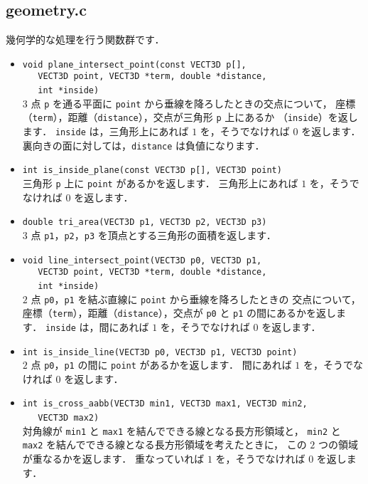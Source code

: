 \subsection{geometry.c}

幾何学的な処理を行う関数群です．

\begin{itemize}
\item \verb|void plane_intersect_point(const VECT3D p[], | \\
	\verb|   VECT3D point, VECT3D *term, double *distance, | \\
	\verb|   int *inside)| \ \\
$3$ 点 \verb|p| を通る平面に \verb|point| から垂線を降ろしたときの交点について，
座標（\verb|term|），距離（\verb|distance|），交点が三角形 \verb|p| 上にあるか
（\verb|inside|）を返します．
\verb|inside| は，三角形上にあれば $1$ を，そうでなければ $0$ を返します．
裏向きの面に対しては，\verb|distance| は負値になります．

\item \verb|int is_inside_plane(const VECT3D p[], VECT3D point)| \ \\
三角形 \verb|p| 上に \verb|point| があるかを返します．
三角形上にあれば $1$ を，そうでなければ $0$ を返します．

\item \verb|double tri_area(VECT3D p1, VECT3D p2, VECT3D p3)| \ \\
$3$ 点 \verb|p1|，\verb|p2|，\verb|p3| を頂点とする三角形の面積を返します．

\item \verb|void line_intersect_point(VECT3D p0, VECT3D p1, | \\
	\verb|   VECT3D point, VECT3D *term, double *distance, | \\
	\verb|   int *inside)| \ \\
$2$ 点 \verb|p0|，\verb|p1| を結ぶ直線に \verb|point| から垂線を降ろしたときの
交点について，座標（\verb|term|），距離（\verb|distance|），交点が \verb|p0| と
\verb|p1| の間にあるかを返します．
\verb|inside| は，間にあれば $1$ を，そうでなければ $0$ を返します．

\item \verb|int is_inside_line(VECT3D p0, VECT3D p1, VECT3D point)| \ \\
$2$ 点 \verb|p0|，\verb|p1| の間に \verb|point| があるかを返します．
間にあれば $1$ を，そうでなければ $0$ を返します．

\item \verb|int is_cross_aabb(VECT3D min1, VECT3D max1, VECT3D min2, | \\
	\verb|   VECT3D max2)| \ \\
対角線が \verb|min1| と \verb|max1| を結んでできる線となる長方形領域と，
\verb|min2| と \verb|max2| を結んでできる線となる長方形領域を考えたときに，
この $2$ つの領域が重なるかを返します．
重なっていれば $1$ を，そうでなければ $0$ を返します．
\end{itemize}


